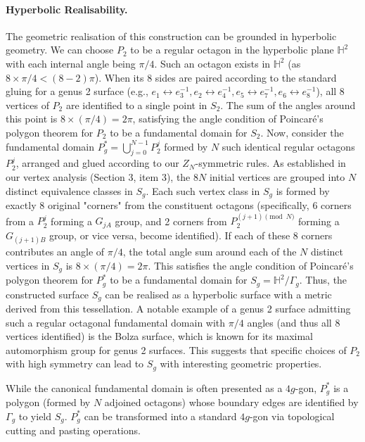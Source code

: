 \documentclass{article}
\theoremstyle{definition}
\theoremstyle{remark}
\begin{document}
\paragraph{Hyperbolic Realisability.} The geometric realisation of this construction can be grounded in hyperbolic geometry. We can choose $P_2$ to be a regular octagon in the hyperbolic plane $\mathbb{H}^2$ with each internal angle being $\pi/4$. Such an octagon exists in $\mathbb{H}^2$ (as $8 \times \pi/4 < (8-2)\pi$). When its 8 sides are paired according to the standard gluing for a genus 2 surface (e.g., $e_1 \leftrightarrow e_3^{-1}, e_2 \leftrightarrow e_4^{-1}, e_5 \leftrightarrow e_7^{-1}, e_6 \leftrightarrow e_8^{-1}$), all 8 vertices of $P_2$ are identified to a single point in $S_2$. The sum of the angles around this point is $8 \times (\pi/4) = 2\pi$, satisfying the angle condition of Poincaré's polygon theorem for $P_2$ to be a fundamental domain for $S_2$.
Now, consider the fundamental domain $P_g^* = \bigcup_{j=0}^{N-1} P_2^j$ formed by $N$ such identical regular octagons $P_2^j$, arranged and glued according to our $Z_N$-symmetric rules. As established in our vertex analysis (Section 3, item 3), the $8N$ initial vertices are grouped into $N$ distinct equivalence classes in $S_g$. Each such vertex class in $S_g$ is formed by exactly 8 original "corners" from the constituent octagons (specifically, 6 corners from a $P_2^j$ forming a $G_{jA}$ group, and 2 corners from $P_2^{(j+1) \pmod N}$ forming a $G_{(j+1)B}$ group, or vice versa, become identified). If each of these 8 corners contributes an angle of $\pi/4$, the total angle sum around each of the $N$ distinct vertices in $S_g$ is $8 \times (\pi/4) = 2\pi$. This satisfies the angle condition of Poincaré's polygon theorem for $P_g^*$ to be a fundamental domain for $S_g = \mathbb{H}^2/\Gamma_g$. Thus, the constructed surface $S_g$ can be realised as a hyperbolic surface with a metric derived from this tessellation. A notable example of a genus 2 surface admitting such a regular octagonal fundamental domain with $\pi/4$ angles (and thus all 8 vertices identified) is the Bolza surface, which is known for its maximal automorphism group for genus 2 surfaces. This suggests that specific choices of $P_2$ with high symmetry can lead to $S_g$ with interesting geometric properties.

While the canonical fundamental domain is often presented as a $4g$-gon, $P_g^*$ is a polygon (formed by $N$ adjoined octagons) whose boundary edges are identified by $\Gamma_g$ to yield $S_g$. $P_g^*$ can be transformed into a standard $4g$-gon via topological cutting and pasting operations.
\end{document}
